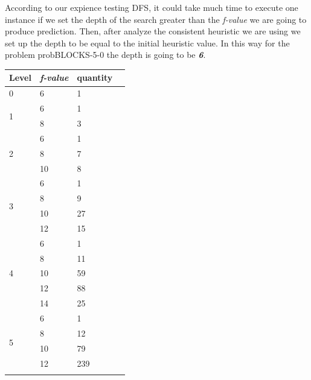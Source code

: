 \documentclass[11pt,a4paper,oneside]{report}
\begin{document}
According to our expience testing DFS, it could take much time to execute one instance if we set the depth of the search greater than the \textit{f-value} we are going to produce prediction. Then, after analyze the consistent heuristic we are using we set up the depth to be equal to the initial heuristic value. In this way for the problem probBLOCKS-5-0 the depth is going to be \textbf{\textit{6}}.

\footnotesize  %
\setlength\LTleft{100pt}            %
\setlength\LTright{200pt}           %
\begin{longtable}{@{\extracolsep{\fill}} llll @{}}
\hline

Level               & \textit{f-value} & quantity \\ \hline
0                   & 6       & 1        \\ \hline
\multirow{2}{*}{1}  & 6       & 1        \\ \cline{2-3} 
                    & 8       & 3        \\ \hline
\multirow{3}{*}{2}  & 6       & 1        \\ \cline{2-3} 
                    & 8       & 7        \\ \cline{2-3} 
                    & 10      & 8        \\ \hline
\multirow{4}{*}{3}  & 6       & 1        \\ \cline{2-3} 
                    & 8       & 9        \\ \cline{2-3} 
                    & 10      & 27       \\ \cline{2-3} 
                    & 12      & 15       \\ \hline
\multirow{5}{*}{4}  & 6       & 1        \\ \cline{2-3} 
                    & 8       & 11       \\ \cline{2-3} 
                    & 10      & 59       \\ \cline{2-3} 
                    & 12      & 88       \\ \cline{2-3} 
                    & 14      & 25       \\ \hline
\multirow{6}{*}{5}  & 6       & 1        \\ \cline{2-3} 
                    & 8       & 12       \\ \cline{2-3} 
                    & 10      & 79       \\ \cline{2-3} 
                    & 12      & 239      \\ \cline{2-3} 

\end{longtable}
\end{document}
